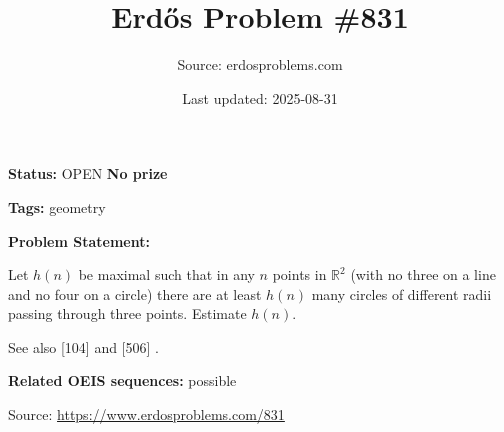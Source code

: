 \documentclass{article}
\title{Erd\H{o}s Problem \#831}
\date{Last updated: 2025-08-31}
\author{Source: erdosproblems.com}
\begin{document}
\maketitle

\noindent\textbf{Status:} OPEN \quad \textbf{No prize}

\noindent\textbf{Tags:} geometry

\medskip

\noindent\textbf{Problem Statement:}

Let $h(n)$ be maximal such that in any $n$ points in $\mathbb{R}^2$ (with no three on a line and no four on a circle) there are at least $h(n)$ many circles of different radii passing through three points. Estimate $h(n)$.




See also [104] and [506] .

\noindent\textbf{Related OEIS sequences:} possible


\bigskip
\noindent\small{Source: \url{https://www.erdosproblems.com/831}}
\end{document}
